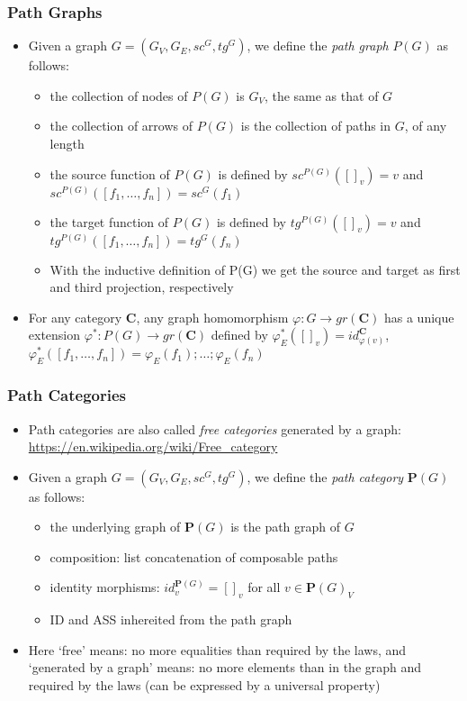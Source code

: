 \documentclass[handout]{beamer}
\newcommand{\bfsf}[1]{{\boldsymbol{#1}}}
\newcommand{\CC}{\bfsf{C}}
\newcommand{\PP}{\bfsf{P}}
\begin{document}
\frame
  {   
    \frametitle{Path Graphs}\label{Ch2:PathGras}

 \begin{itemize}[<+->]
\item Given a graph $G = (G_V,G_E,sc^G, tg^G)$, we define the \emph{path graph}
$P(G)$ as follows:
   \begin{itemize}[<+->]
\item the collection of nodes of $P(G)$ is $G_V$, the same as that of $G$
\item the collection of arrows of $P(G)$ is the collection of paths in $G$, of any length
\item the source function of $P(G)$ is defined by
$sc^{P(G)}([]_v) = v$ and $sc^{P(G)}([f_1,\ldots,f_n]) = sc^G(f_1)$
\item the target function of $P(G)$ is defined by
$tg^{P(G)}([]_v) = v$ and $tg^{P(G)}([f_1,\ldots,f_n]) = tg^G(f_n)$
\item With the inductive definition of {P(G)} we get the source and target as
first and third projection, respectively
   \end{itemize}
\item For any category $\CC$, any graph homomorphism $\varphi: G\to gr(\CC)$
has a unique extension $\varphi^*: P(G)\to gr(\CC)$ defined by 
$\varphi^*_E([]_v) = id^\CC_{\varphi(v)}$,
$\varphi^*_E([f_1,\ldots,f_n]) = \varphi_E(f_1) ; \ldots  ;\varphi_E(f_n)$
 \end{itemize}

 }

\frame
  {   
    \frametitle{Path Categories}\label{Ch2:PathCats}

 \begin{itemize}[<+->]
\item Path categories are also called \emph{free categories} generated by a graph:
\url{https://en.wikipedia.org/wiki/Free\_category}
\item Given a graph $G = (G_V,G_E,sc^G, tg^G)$, we define the \emph{path category}
$\PP(G)$ as follows:
   \begin{itemize}[<+->]
\item the underlying graph of $\PP(G)$ is the path graph of $G$
\item composition: list concatenation of composable paths 
\item identity morphisms: $id^{\PP(G)}_v = []_v$ for all $v\in\PP(G)_V$
\item ID and ASS inhereited from the path graph
   \end{itemize}
\item Here `free' means: no more equalities than required by the laws,
and `generated by a graph' means: no more elements than in the graph and
required by the laws (can be expressed by a universal property)
 \end{itemize}

 }
\end{document}
